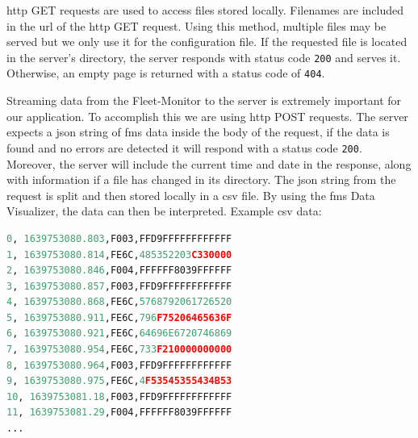 \acrshort{http} GET requests are used to access files stored locally. Filenames are included in the \acrshort{url} of the \acrshort{http} GET request. Using this method, multiple files may be served but we only use it for the configuration file. If the requested file is located in the server's directory, the server responds with status code \texttt{200} and serves it. Otherwise, an empty page is returned with a status code of \texttt{404}.

Streaming data from the Fleet-Monitor to the server is extremely important for our application. To accomplish this we are using \acrshort{http} POST requests. The server expects a \acrshort{json} string of \acrshort{fms} data inside the body of the request, if the data is found and no errors are detected it will respond with a status code \texttt{200}. Moreover, the server will include the current time and date in the response, along with information if a file has changed in its directory. The \acrshort{json} string from the request is split and then stored locally in a \acrshort{csv} file. By using the \acrshort{fms} Data Visualizer, the data can then be interpreted. Example \acrshort{csv} data:

\bigskip
{}
\begin{lstlisting}[backgroundcolor=\color{gray!10},  
                   basicstyle=\ttfamily,
                   columns=fullflexible,
                   breakatwhitespace=false,      
                   breaklines=true,                
                   captionpos=b,                    
                   commentstyle=\color{mygreen}, 
                   extendedchars=true,              
                   frame=single,                   
                   keepspaces=true,             
                   keywordstyle=\color{blue},      
                   language=Python,                 
                   numbers=none,                
                   numbersep=5pt,                   
                   numberstyle=\color{blue}, 
                   rulecolor=\color{mygray},        
                   showspaces=false,
                   showstringspaces=false,
                   showtabs=false,                 
                   stepnumber=5,                  
                   stringstyle=\color{mymauve},    
                   tabsize=2,                      
                   title=\lstname,
                   frame=none,
                   xleftmargin = 1cm,
                   framexleftmargin = 1em]
0, 1639753080.803,F003,FFD9FFFFFFFFFFFF
1, 1639753080.814,FE6C,485352203C330000
2, 1639753080.846,F004,FFFFFF8039FFFFFF
3, 1639753080.857,F003,FFD9FFFFFFFFFFFF
4, 1639753080.868,FE6C,5768792061726520 
5, 1639753080.911,FE6C,796F75206465636F 
6, 1639753080.921,FE6C,64696E6720746869
7, 1639753080.954,FE6C,733F210000000000
8, 1639753080.964,F003,FFD9FFFFFFFFFFFF
9, 1639753080.975,FE6C,4F53545355434B53
10, 1639753081.18,F003,FFD9FFFFFFFFFFFF
11, 1639753081.29,F004,FFFFFF8039FFFFFF
...

\end{lstlisting}

